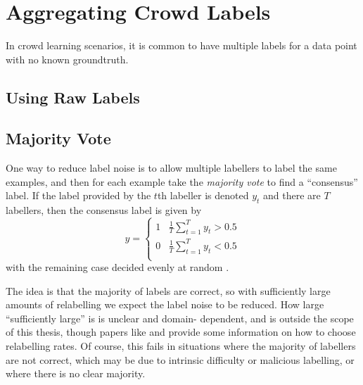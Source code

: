 \section{Aggregating Crowd Labels}
\label{sec:crowd-labels}



    In crowd learning scenarios, it is common to have multiple labels for a data
    point with no known groundtruth.


    \subsection{Using Raw Labels}
    \label{sec:raw-labels}


    \subsection{Majority Vote}
    \label{sec:majority-vote}

        One way to reduce label noise is to allow multiple labellers to label
        the same examples, and then for each example take the \emph{majority
        vote} to find a ``consensus'' label. If the label provided by the $t$th
        labeller is denoted $y_t$ and there are $T$ labellers, then the
        consensus label is given by
        \begin{equation*}
            y = \begin{cases}
                1 & \frac{1}{T} \sum_{t = 1}^T y_t > 0.5\\
                0 & \frac{1}{T} \sum_{t = 1}^T y_t < 0.5\\
            \end{cases}
        \end{equation*}
        with the remaining case decided evenly at random \citep{raykar10}.

        The idea is that the majority of labels are correct, so with
        sufficiently large amounts of relabelling we expect the label noise to
        be reduced. How large ``sufficiently large'' is is unclear and domain-
        dependent, and is outside the scope of this thesis, though papers like
        \citet{sheng08} and \citet{lin16} provide some information on how to
        choose relabelling rates. Of course, this fails in situations where the
        majority of labellers are not correct, which may be due to intrinsic
        difficulty or malicious labelling, or where there is no clear majority.

